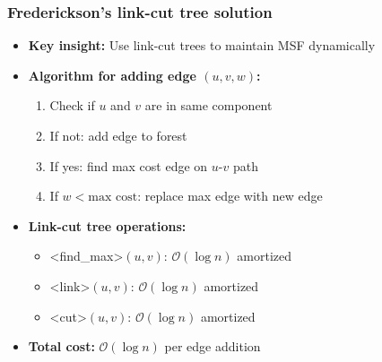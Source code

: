 \documentclass[fleqn]{beamer}
\newcommand{\Oh}{\mathcal{O}}
\def\texttt#1{<#1>}%
\begin{document}
\begin{frame}
    \frametitle{Frederickson's link-cut tree solution}
    
    \begin{itemize}
    \item \textbf{Key insight:} Use link-cut trees to maintain MSF dynamically \vfill\pause
    \item \textbf{Algorithm for adding edge $(u,v,w)$:}
        \begin{enumerate}
        \item Check if $u$ and $v$ are in same component
        \item If not: add edge to forest
        \item If yes: find max cost edge on $u$-$v$ path
        \item If $w < \text{max cost}$: replace max edge with new edge
        \end{enumerate} \vfill\pause
    \item \textbf{Link-cut tree operations:}
        \begin{itemize}
        \item \texttt{find\_max}$(u,v)$: $\Oh(\log n)$ amortized
        \item \texttt{link}$(u,v)$: $\Oh(\log n)$ amortized
        \item \texttt{cut}$(u,v)$: $\Oh(\log n)$ amortized
        \end{itemize} \vfill\pause
    \item \textbf{Total cost:} $\Oh(\log n)$ per edge addition \vfill
    \end{itemize}
\end{frame}
\end{document}
